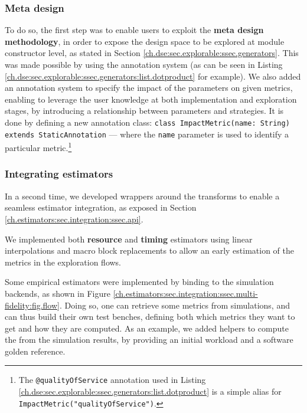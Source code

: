         \subsubsection{Meta design}
            To do so, the first step was to enable users to exploit the {\bf meta design methodology}, in order to expose the design space to be explored at module constructor level, as stated in Section \ref{ch.dse:sec.explorable:ssec.generators}.
            This was made possible by using the \java{} annotation system (as can be seen in Listing \ref{ch.dse:sec.explorable:ssec.generators:list.dotproduct} for example).
            We also added an annotation system to specify the impact of the parameters on given metrics, enabling to leverage the user knowledge at both implementation and exploration stages, by introducing a relationship between parameters and strategies.
            It is done by defining a new annotation class: \lstinline{class ImpactMetric(name: String) extends StaticAnnotation} --- where the \lstinline{name} parameter is used to identify a particular metric.\footnote{The \lstinline{@qualityOfService} annotation used in Listing \ref{ch.dse:sec.explorable:ssec.generators:list.dotproduct} is a simple alias for \lstinline{ImpactMetric("qualityOfService")}.}

        \subsubsection{Integrating estimators}
            In a second time, we developed wrappers around the \firrtl{} transforms to enable a seamless estimator integration, as exposed in Section \ref{ch.estimators:sec.integration:ssec.api}.

            We implemented both {\bf resource} and {\bf timing} estimators using linear interpolations and macro block replacements to allow an early estimation of the metrics in the exploration flows.

            Some empirical  estimators were implemented by binding to the \chisel{} simulation backends, as shown in Figure \ref{ch.estimators:sec.integration:ssec.multi-fidelity:fig.flow}.
            Doing so, one can retrieve some metrics from simulations, and can thus build their own test benches, defining both which metrics they want to get and how they are computed.
            As an example, we added helpers to compute the  from the simulation results, by providing an initial workload and a software golden reference.

